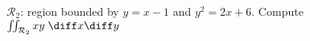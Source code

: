 \begin{frame}
\begin{example}
$\mathcal{R}_2$: region bounded by $y=x-1$ and $y^2=2x+6$. Compute $ \iint_{\mathcal{R}_2} xy \; \diff x \diff y$
\end{example}
\end{frame}